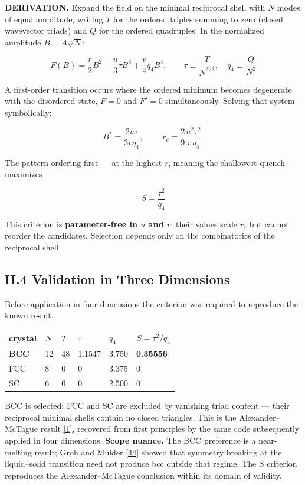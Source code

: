 \documentclass[a4paper,11pt]{article}
\begin{document}
\textbf{DERIVATION.} Expand the field on the minimal reciprocal shell with $N$ modes of equal amplitude, writing $T$ for the ordered triples summing to zero (closed wavevector triads) and $Q$ for the ordered quadruples. In the normalized amplitude $B=A\sqrt N$:

\[F(B)=\frac r2B^2-\frac u3\tau B^3+\frac v4q_4B^4,\qquad \tau\equiv\frac{T}{N^{3/2}},\quad q_4\equiv\frac{Q}{N^2}\]

A first-order transition occurs where the ordered minimum becomes degenerate with the disordered state, $F=0$ and $F'=0$ simultaneously. Solving that system symbolically:

\[B^{*}=\frac{2u\tau}{3vq_4},\qquad \boxed{\;r_c=\frac29\frac{u^2\tau^2}{v\,q_4}\;}\]

The pattern ordering first — at the highest $r$, meaning the shallowest quench — maximizes

\[S=\frac{\tau^2}{q_4}\]

This criterion is \textbf{parameter-free in $u$ and $v$}: their values scale $r_c$ but cannot reorder the candidates. Selection depends only on the combinatorics of the reciprocal shell.

\subsection*{II.4 Validation in Three Dimensions}

Before application in four dimensions the criterion was required to reproduce the known result.

\begin{center}
\begin{tabular}{llllll}
\hline
crystal & $N$ & $T$ & $\tau$ & $q_4$ & $S=\tau^2/q_4$ \\
\hline
\textbf{BCC} & 12 & 48 & 1.1547 & 3.750 & \textbf{0.35556} \\
FCC & 8 & 0 & 0 & 3.375 & 0 \\
SC & 6 & 0 & 0 & 2.500 & 0 \\
\hline
\end{tabular}
\end{center}

BCC is selected; FCC and SC are excluded by vanishing triad content — their reciprocal minimal shells contain no closed triangles. This is the Alexander–McTague result \hyperref[ref1]{[1]}, recovered from first principles by the same code subsequently applied in four dimensions. \textbf{Scope nuance.} The BCC preference is a near-melting result; Groh and Mulder \hyperref[ref44]{[44]} showed that symmetry breaking at the liquid–solid transition need not produce bcc outside that regime. The $S$ criterion reproduces the Alexander–McTague conclusion within its domain of validity.
\end{document}
